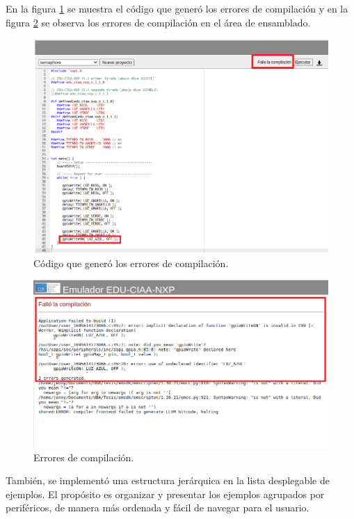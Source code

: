 En la figura \ref{fig:PlataformaErrores2} se muestra el código que generó los errores de compilación y en la figura \ref{fig:PlataformaErrores1} se observa los errores de compilación en el área de ensamblado.

\begin{figure}[ht]
	\centering
	\includegraphics[scale=.42]{./Figures/PlataformaErrores1.png}
	\caption{Código que generó los errores de compilación.}
	\label{fig:PlataformaErrores2}
\end{figure}

\begin{figure}[ht]
	\centering
	\includegraphics[scale=.39]{./Figures/PlataformaErrores2.png}
	\caption{Errores de compilación.}
	\label{fig:PlataformaErrores1}
\end{figure}

También, se implementó una estructura jerárquica en la lista desplegable de ejemplos. El propósito es organizar y presentar los ejemplos agrupados por periféricos, de manera más ordenada y fácil de navegar para el usuario.

